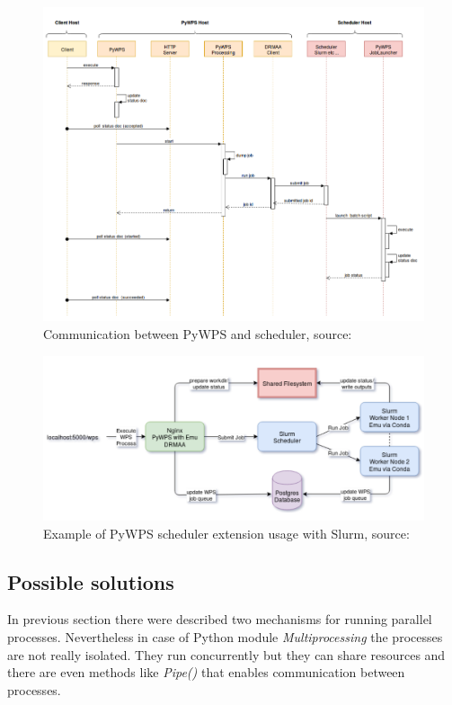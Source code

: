 \documentclass[12pt,a4paper]{article}
\begin{document}
\begin{figure}[h!]
\centering
\includegraphics[width=\textwidth]{img/Isolation_interaction.png}
\caption{Communication between PyWPS and scheduler, source: \cite{PyWPS_docs}}
\label{fig:Isolation_interaction}
\end{figure}

\begin{figure}[h!]
\centering
\includegraphics[width=\textwidth]{img/Isolation_slurm_usage.png}
\caption{Example of PyWPS scheduler extension usage with Slurm, source: \cite{PyWPS_docs}}
\label{fig:Isolation_slurm_usage}
\end{figure}

\subsection{Possible solutions}
In previous section there were described two mechanisms for running parallel processes. Nevertheless in case of Python module
\textit{Multiprocessing} the processes are not really isolated. They run concurrently but they can share resources and there are 
even methods like \textit{Pipe()} that enables communication between processes.
\end{document}
